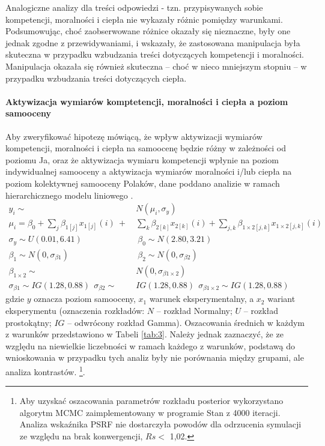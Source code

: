\documentclass[man]{apa6}
\begin{document}
Analogiczne analizy dla treści odpowiedzi - tzn. przypisywanych sobie kompetencji, moralności i ciepła nie wykazały różnic pomiędzy warunkami. Podsumowując, choć zaobserwowane różnice okazały się nieznaczne, były one jednak zgodne z przewidywaniami, i wskazały, że zastosowana manipulacja była skuteczna w przypadku wzbudzania treści dotyczących kompetencji i moralności. Manipulacja okazała się również skuteczna -- choć w nieco mniejszym stopniu -- w przypadku wzbudzania treści dotyczących ciepła.\\

\paragraph{Aktywizacja wymiarów komptetencji, moralności i ciepła a poziom samooceny}
Aby zweryfikować hipotezę mówiącą, że wpływ aktywizacji wymiarów kompetencji, moralności i ciepła na samoocenę będzie różny w zależności od poziomu Ja, oraz że aktywizacja wymiaru kompetencji wpłynie na poziom indywidualnej samooceny a aktywizacja wymiarów moralności i/lub ciepła na poziom kolektywnej samooceny Polaków, dane poddano analizie w ramach hierarchicznego modelu liniowego \parencite[jako odpowiednika klasycznej dwuczynnikowej analizy wariancji, za:,][]{kruschke2014doing}.
\begin{equation}\label{eq:4}
\begin{split}
y_i  \sim\ & N(\mu_i, \sigma_y) \\
\mu_i  = \beta_0 + \sum_j\beta_{1[j]}x_{1[j]}(i)\ +\ &\sum_k\beta_{2[k]}x_{2[k]}(i)+\sum_{j,k}\beta_{1\times2[j,k]}x_{1\times2[j,k]}(i) \\
\sigma_y \sim U(0.01,6.41)\ &\ \beta_0 \sim N(2.80, 3.21) \\
\beta_1 \sim N(0, \sigma_{\beta1})\ &\ \beta_2 \sim N(0, \sigma_{\beta2}) \\
\beta_{1\times2} \sim\ & N(0, \sigma_{\beta1\times2}) \\
\sigma_{\beta1} \sim IG(1.28,0.88)\ \ \sigma_{\beta2} \sim\ & IG(1.28,0.88)\ \ \sigma_{\beta1\times2} \sim IG(1.28,0.88)
\end{split}
\end{equation}
gdzie $y$ oznacza poziom samooceny, $x_1$ warunek eksperymentalny, a $x_2$ wariant eksperymentu (oznaczenia rozkładów: $N$ -- rozkład Normalny; $U$ -- rozkład prostokątny; $IG$ -- odwrócony rozkład Gamma). Oszacowania średnich w każdym z warunków przedstawiono w Tabeli \ref{tab:3}. Należy jednak zaznaczyć, że ze względu na niewielkie liczebności w ramach każdego z warunków, podstawą do wnioskowania w przypadku tych analiz były nie porównania między grupami, ale analiza kontrastów. \footnote{Aby uzyskać oszacowania parametrów rozkładu posterior wykorzystano algorytm MCMC zaimplementowany w programie Stan \parencite{carpenter2016} z 4000 iteracji. Analiza wskaźnika PSRF nie dostarczyła powodów dla odrzucenia symulacji ze względu na brak konwergencji, $Rs <$ 1,02.}.  \\
\end{document}
